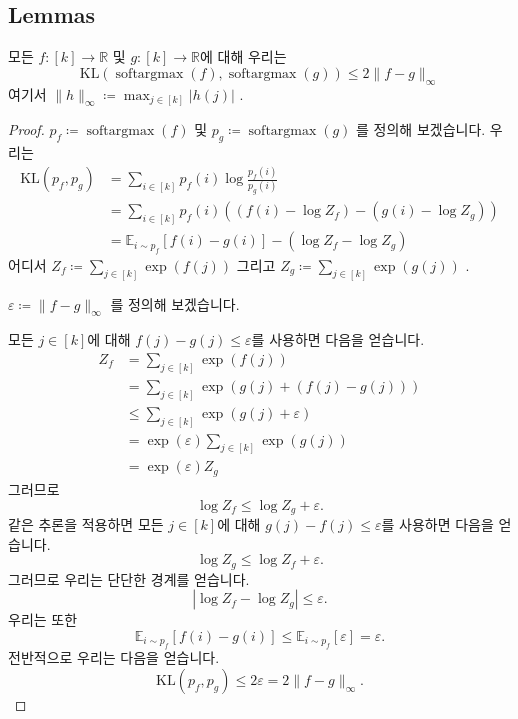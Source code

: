 \documentclass{article}
\def\RR{{\mathbb{R}}}
\def\EE{{\mathbb{E}}}
\def\softargmax{{\operatorname{softargmax}}}
\def\KL{{\mathrm{KL}}}
\begin{document}
\subsection{Lemmas}


\begin{lemma} 
모든 $f \colon [k] \to \RR$ 및 $g \colon [k] \to \RR$에 대해 우리는
 \begin{equation} 
 \KL ( \softargmax (f), \softargmax (g)) \le 2 \|f - g\|_ \infty 
 \end{equation} 
여기서 $\|h\|_\infty \coloneqq \max_{j \in [k]} |h(j)|$ .
 \label{lemma:kl_bound} 
 \end{lemma} 
 \begin{proof} 
$p_f \coloneqq \softargmax(f)$ 및 $p_g \coloneqq \softargmax(g)$ 를 정의해 보겠습니다.
우리는
 \begin{align} 
 \KL (p_f, p_g) 
&= \sum _{i \in [k]} p_f(i) \log \frac{p_f(i)} {p_g(i)} \\
&= \sum _{i \in [k]} p_f(i) ((f(i) - \log Z_f) - (g(i) - \log Z_g)) \\
&= \EE _{i \sim p_f} [f(i) - g(i)] - ( \log Z_f - \log Z_g)
 \end{align} 
어디서 
 $Z_f \coloneqq \sum_{j \in [k]} \exp(f(j))$ 
그리고
 $Z_g \coloneqq \sum_{j \in [k]} \exp(g(j))$ .

$\varepsilon \coloneqq \|f - g\|_\infty$ 를 정의해 보겠습니다.

모든 $j \in [k]$에 대해 $f(j) - g(j) \le \varepsilon$를 사용하면 다음을 얻습니다.
 \begin{align} 
Z_f 
&= \sum _{j \in [k]} \exp (f(j)) \\
&= \sum _{j \in [k]} \exp (g(j) + (f(j) - g(j))) \\
& \le \sum _{j \in [k]} \exp (g(j) + \varepsilon ) \\
&= \exp ( \varepsilon ) \sum _{j \in [k]} \exp (g(j)) \\
&= \exp ( \varepsilon ) Z_g
 \end{align} 
그러므로
 \begin{equation} 
 \log Z_f \le \log Z_g + \varepsilon .
 \end{equation} 
같은 추론을 적용하면
모든 $j \in [k]$에 대해 $g(j) - f(j) \le \varepsilon$를 사용하면 다음을 얻습니다.
 \begin{equation} 
 \log Z_g \le \log Z_f + \varepsilon .
 \end{equation} 
그러므로 우리는 단단한 경계를 얻습니다.
 \begin{equation} 
| \log Z_f - \log Z_g|  \le \varepsilon .
 \end{equation} 
우리는 또한
 \begin{equation} 
 \EE _{i \sim p_f} [f(i) - g(i)]
 \le \EE _{i \sim p_f} [ \varepsilon ]
= \varepsilon .
 \end{equation} 
전반적으로 우리는 다음을 얻습니다.
 \begin{equation} 
 \KL (p_f, p_g) \le 2 \varepsilon = 2 \|f - g\|_ \infty .
 \end{equation}

\end{proof}
\end{document}
